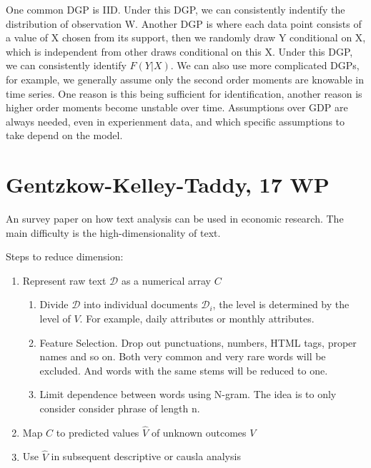 \documentclass{book}
\theoremstyle{plain}
\theoremstyle{definition}
\begin{document}
One common DGP is IID. Under this DGP, we can consistently indentify the distribution of observation W. Another DGP is where each data point consists of a value of X chosen from its support, then we randomly draw Y conditional on X, which is independent from other draws conditional on this X. Under this DGP, we can consistently identify $F(Y|X)$. We can also use more complicated DGPs, for example, we generally assume only the second order moments are knowable in time series. One reason is this being sufficient for identification, another reason is higher order moments become unstable over time. Assumptions over GDP are always needed, even in experienment data, and which specific assumptions to take depend on the model.





\section{Gentzkow-Kelley-Taddy, 17 WP} %
\label{sec:gentzkow_kelley_taddy_17_wp}

\noindent
\textbf{}

An survey paper on how text analysis can be used in economic research. 
The main difficulty is the high-dimensionality of text.

\noindent
Steps to reduce dimension:
\begin{enumerate}
	\item Represent raw text $\mathcal{D}$ as a numerical array $C$
	\begin{enumerate}
		\item Divide $\mathcal D$ into individual documents $\mathcal D_i$, the level is determined by the level of $V$. For example, daily attributes or monthly attributes.
		\item Feature Selection. Drop out punctuations, numbers, HTML tags, proper names and so on. Both very common and very rare words will be excluded. And words with the same stems will be reduced to one.
		\item Limit dependence between words using N-gram. The idea is to only consider consider phrase of length n.
	\end{enumerate}
	\item Map $C$ to predicted values $\hat V$ of unknown outcomes $V$
	\item Use $\hat V$ in subsequent descriptive or causla analysis
\end{enumerate}
\end{document}
